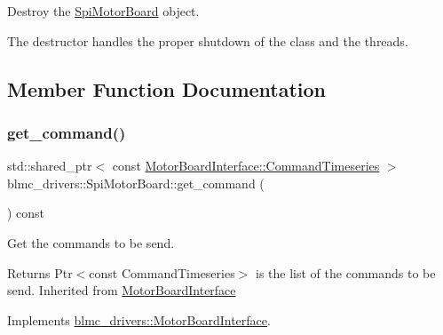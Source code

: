 Destroy the \hyperlink{classblmc__drivers_1_1SpiMotorBoard}{Spi\+Motor\+Board} object. 

The destructor handles the proper shutdown of the class and the threads. 

\subsection{Member Function Documentation}
\mbox{\label{classblmc__drivers_1_1SpiMotorBoard_ad8640595ac4c46af1847fd141946d640}} 
\subsubsection{\texorpdfstring{get\+\_\+command()}{get\_command()}}
{\footnotesize\ttfamily std\+::shared\+\_\+ptr$<$ const \hyperlink{classblmc__drivers_1_1MotorBoardInterface_ae2afe94a023d9f08a4c689e9b7660f15}{Motor\+Board\+Interface\+::\+Command\+Timeseries} $>$ blmc\+\_\+drivers\+::\+Spi\+Motor\+Board\+::get\+\_\+command (\begin{DoxyParamCaption}{ }\end{DoxyParamCaption}) const\hspace{0.3cm}{\ttfamily [virtual]}}



Get the commands to be send. 

\begin{DoxyReturn}{Returns}
Ptr$<$const Command\+Timeseries$>$ is the list of the commands to be send. Inherited from \hyperlink{classblmc__drivers_1_1MotorBoardInterface}{Motor\+Board\+Interface} 
\end{DoxyReturn}


Implements \hyperlink{classblmc__drivers_1_1MotorBoardInterface_a4913308c1eacc98475aeb8647447c997}{blmc\+\_\+drivers\+::\+Motor\+Board\+Interface}.

\mbox{\label{classblmc__drivers_1_1SpiMotorBoard_a52791e9a5e9fd7db347c97b399bdeee8}} 
